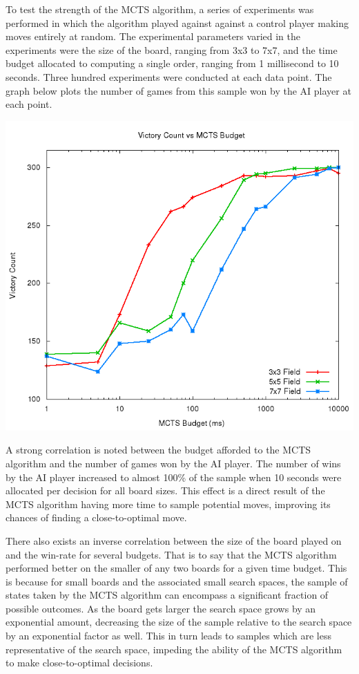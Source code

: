\documentclass[landscape,final,a0paper,10pt]{baposter}
\begin{document}
\begin{poster}
{
To test the strength of the MCTS algorithm, a series of experiments was performed in which the algorithm played against against a control player making moves entirely at random.
The experimental parameters varied in the experiments were the size of the board, ranging from 3x3 to 7x7, and the time budget allocated to computing a single order, ranging from 1 millisecond to 10 seconds.
Three hundred experiments were conducted at each data point.
The graph below plots the number of games from this sample won by the AI player at each point.

\vspace{0.3cm}

\includegraphics[width=0.9\colwidth]{../images/lineplot}

\vspace{0.3cm}

A strong correlation is noted between the budget afforded to the MCTS algorithm and the number of games won by the AI player.
The number of wins by the AI player increased to almost 100\% of the sample when 10 seconds were allocated per decision for all board sizes.
This effect is a direct result of the MCTS algorithm having more time to sample potential moves, improving its chances of finding a close-to-optimal move.

There also exists an inverse correlation between the size of the board played on and the win-rate for several budgets.
That is to say that the MCTS algorithm performed better on the smaller of any two boards for a given time budget.
This is because for small boards and the associated small search spaces, the sample of states taken by the MCTS algorithm can encompass a significant fraction of possible outcomes.
As the board gets larger the search space grows by an exponential amount, decreasing the size of the sample relative to the search space by an exponential factor as well.
This in turn leads to samples which are less representative of the search space, impeding the ability of the MCTS algorithm to make close-to-optimal decisions.
}


\end{poster}
\end{document}
